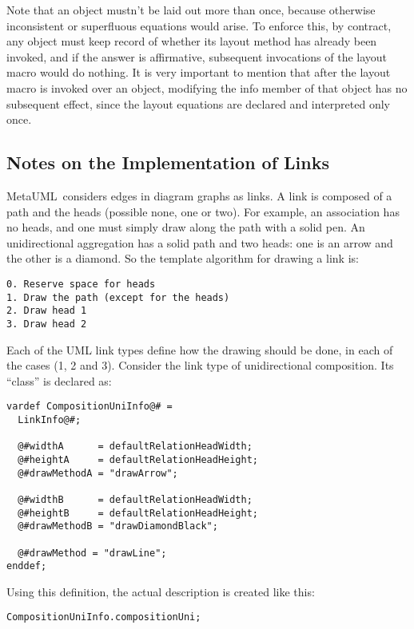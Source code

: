 \documentclass{article}
\newcommand{\code}{\ttfamily}
\newcommand{\metauml}{MetaUML}
\begin{document}
Note that an object mustn't be laid out more than once, because otherwise
inconsistent or superfluous equations would arise. To enforce this, by contract,
any object must keep record of whether its layout method has already been invoked,
and if the answer is affirmative, subsequent invocations of the layout macro would
do nothing. It is very important to mention that after the {\code layout} macro is
invoked over an object, modifying the {\code info} member of that object has
no subsequent effect, since the layout equations are declared and interpreted only once.

\subsection{Notes on the Implementation of Links}

\metauml\ considers edges in diagram graphs as links. A link is composed of a path and the
heads (possible none, one or two). For example, an association has no heads, and one must simply
draw along the path with a solid pen. An unidirectional aggregation has a solid path and two
heads: one is an arrow and the other is a diamond. So the template algorithm for drawing a link
is:

\begin{verbatim}
0. Reserve space for heads
1. Draw the path (except for the heads)
2. Draw head 1
3. Draw head 2
\end{verbatim}

Each of the UML link types define how the drawing should be done, in each of the
cases (1, 2 and 3). Consider the link type of unidirectional composition.
Its ``class'' is declared as:

\begin{verbatim}
vardef CompositionUniInfo@# =
  LinkInfo@#;

  @#widthA      = defaultRelationHeadWidth;
  @#heightA     = defaultRelationHeadHeight;
  @#drawMethodA = "drawArrow";

  @#widthB      = defaultRelationHeadWidth;
  @#heightB     = defaultRelationHeadHeight;
  @#drawMethodB = "drawDiamondBlack";

  @#drawMethod = "drawLine";
enddef;
\end{verbatim}

Using this definition, the actual description is created like this:

\begin{verbatim}
CompositionUniInfo.compositionUni;
\end{verbatim}
\end{document}
